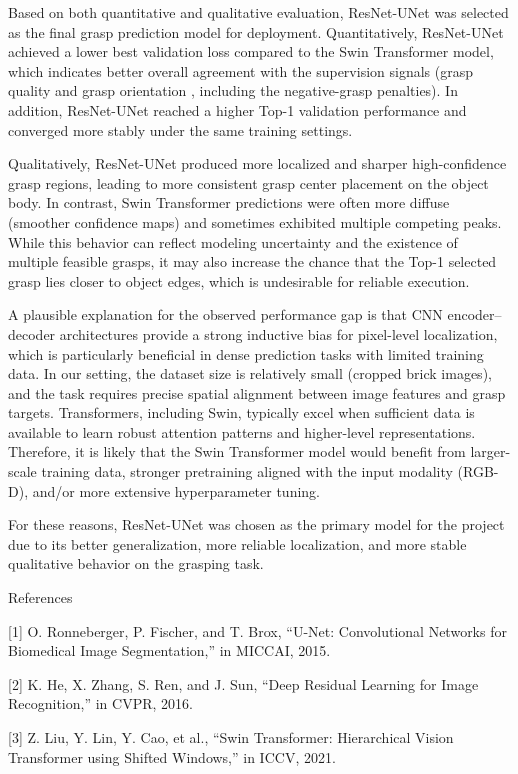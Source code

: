Based on both quantitative and qualitative evaluation, ResNet-UNet was selected as the final grasp prediction model for deployment. Quantitatively, ResNet-UNet achieved a lower best validation loss compared to the Swin Transformer model, which indicates better overall agreement with the supervision signals (grasp quality and grasp orientation , including the negative-grasp penalties). In addition, ResNet-UNet reached a higher Top-1 validation performance and converged more stably under the same training settings.

Qualitatively, ResNet-UNet produced more localized and sharper high-confidence grasp regions, leading to more consistent grasp center placement on the object body. In contrast, Swin Transformer predictions were often more diffuse (smoother confidence maps) and sometimes exhibited multiple competing peaks. While this behavior can reflect modeling uncertainty and the existence of multiple feasible grasps, it may also increase the chance that the Top-1 selected grasp lies closer to object edges, which is undesirable for reliable execution.

A plausible explanation for the observed performance gap is that CNN encoder–decoder architectures provide a strong inductive bias for pixel-level localization, which is particularly beneficial in dense prediction tasks with limited training data. In our setting, the dataset size is relatively small (cropped brick images), and the task requires precise spatial alignment between image features and grasp targets. Transformers, including Swin, typically excel when sufficient data is available to learn robust attention patterns and higher-level representations. Therefore, it is likely that the Swin Transformer model would benefit from larger-scale training data, stronger pretraining aligned with the input modality (RGB-D), and/or more extensive hyperparameter tuning.

For these reasons, ResNet-UNet was chosen as the primary model for the project due to its better generalization, more reliable localization, and more stable qualitative behavior on the grasping task.

References

[1] O. Ronneberger, P. Fischer, and T. Brox, “U-Net: Convolutional Networks for Biomedical Image Segmentation,” in MICCAI, 2015.

[2] K. He, X. Zhang, S. Ren, and J. Sun, “Deep Residual Learning for Image Recognition,” in CVPR, 2016.

[3] Z. Liu, Y. Lin, Y. Cao, et al., “Swin Transformer: Hierarchical Vision Transformer using Shifted Windows,” in ICCV, 2021.

